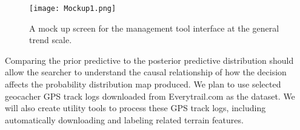 \begin{figure}
\centering
\texttt{[image: Mockup1.png]}
\caption{A mock up screen for the management tool interface at the general trend scale.}
\label{Mockup1}
\end{figure}

Comparing the prior predictive to the posterior predictive distribution should allow the searcher to understand the causal relationship of how the decision affects the probability distribution map produced. We plan to use selected geocacher GPS track logs downloaded from Everytrail.com as the dataset. We will also create utility tools to process these GPS track logs, including automatically downloading and labeling related terrain features.






